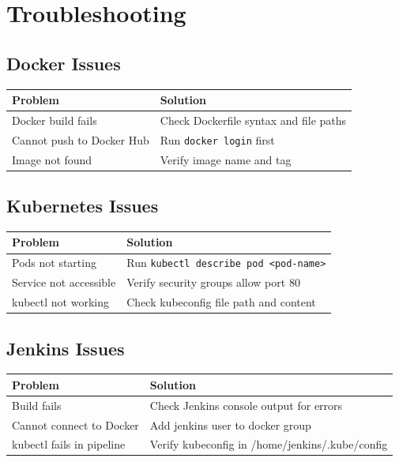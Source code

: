 \documentclass[12pt,a4paper]{article}
\begin{document}
\newpage

\section{Troubleshooting}

\subsection{Docker Issues}

\begin{center}
\begin{tabular}{|p{5cm}|p{8cm}|}
\hline
\textbf{Problem} & \textbf{Solution} \\
\hline
Docker build fails & Check Dockerfile syntax and file paths \\
Cannot push to Docker Hub & Run \texttt{docker login} first \\
Image not found & Verify image name and tag \\
\hline
\end{tabular}
\end{center}

\subsection{Kubernetes Issues}

\begin{center}
\begin{tabular}{|p{5cm}|p{8cm}|}
\hline
\textbf{Problem} & \textbf{Solution} \\
\hline
Pods not starting & Run \texttt{kubectl describe pod <pod-name>} \\
Service not accessible & Verify security groups allow port 80 \\
kubectl not working & Check kubeconfig file path and content \\
\hline
\end{tabular}
\end{center}

\subsection{Jenkins Issues}

\begin{center}
\begin{tabular}{|p{5cm}|p{8cm}|}
\hline
\textbf{Problem} & \textbf{Solution} \\
\hline
Build fails & Check Jenkins console output for errors \\
Cannot connect to Docker & Add jenkins user to docker group \\
kubectl fails in pipeline & Verify kubeconfig in /home/jenkins/.kube/config \\
\hline
\end{tabular}
\end{center}
\end{document}
